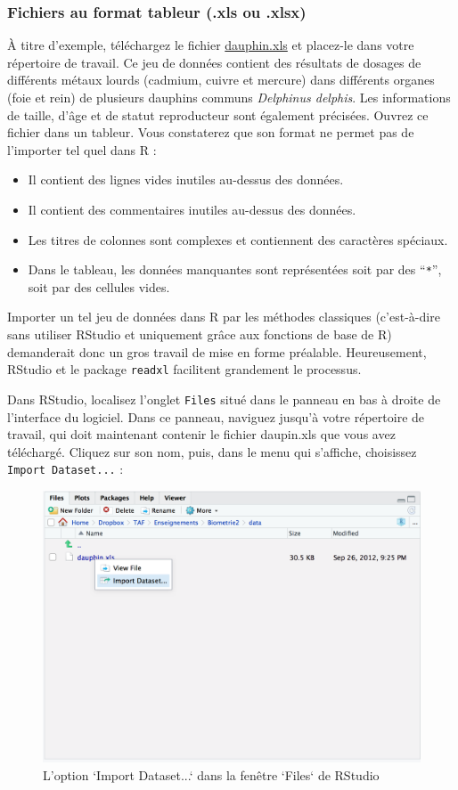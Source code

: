 \documentclass[
  a4paper,
]{article}
\providecommand{\tightlist}{%
  \setlength{\itemsep}{0pt}\setlength{\parskip}{0pt}}
\begin{document}
\hypertarget{tableur}{%
\subsubsection{Fichiers au format tableur (.xls ou .xlsx)}\label{tableur}}

À titre d'exemple, téléchargez le fichier \href{data/dauphin.xls}{dauphin.xls} et placez-le dans votre répertoire de travail. Ce jeu de données contient des résultats de dosages de différents métaux lourds (cadmium, cuivre et mercure) dans différents organes (foie et rein) de plusieurs dauphins communs \emph{Delphinus delphis}. Les informations de taille, d'âge et de statut reproducteur sont également précisées. Ouvrez ce fichier dans un tableur. Vous constaterez que son format ne permet pas de l'importer tel quel dans R :

\begin{itemize}
\tightlist
\item
  Il contient des lignes vides inutiles au-dessus des données.
\item
  Il contient des commentaires inutiles au-dessus des données.
\item
  Les titres de colonnes sont complexes et contiennent des caractères spéciaux.
\item
  Dans le tableau, les données manquantes sont représentées soit par des ``\texttt{*}'', soit par des cellules vides.
\end{itemize}

Importer un tel jeu de données dans R par les méthodes classiques (c'est-à-dire sans utiliser RStudio et uniquement grâce aux fonctions de base de R) demanderait donc un gros travail de mise en forme préalable. Heureusement, RStudio et le package \texttt{readxl} facilitent grandement le processus.

Dans RStudio, localisez l'onglet \texttt{Files} situé dans le panneau en bas à droite de l'interface du logiciel. Dans ce panneau, naviguez jusqu'à votre répertoire de travail, qui doit maintenant contenir le fichier daupin.xls que vous avez téléchargé. Cliquez sur son nom, puis, dans le menu qui s'affiche, choisissez \texttt{Import\ Dataset...} :

\begin{figure}[htpb]

{\centering \includegraphics[width=0.7\linewidth]{images/import} 

}

\caption{L'option `Import Dataset...` dans la fenêtre `Files` de RStudio}\label{fig:import}
\end{figure}
\end{document}
